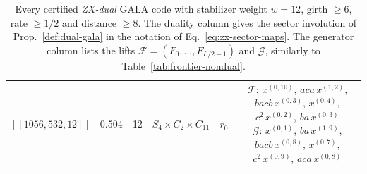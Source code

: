 \begin{table}[t]
\begin{tabular}{lccccc}
$[[1056, 532, 12]]$ & 0.504 & 12 & $S_{4} \times C_{2}\!\times\!C_{11}$ & $r_0^{}$ & \parbox[t]{0.46\textwidth}{\raggedright $\mathcal{F}$: $x^{(0,10)}$, $aca\,x^{(1,2)}$, $bacb\,x^{(0,3)}$, $x^{(0,4)}$, $c^{2}\,x^{(0,2)}$, $ba\,x^{(0,3)}$ \\ $\mathcal{G}$: $x^{(0,1)}$, $ba\,x^{(1,9)}$, $bacb\,x^{(0,8)}$, $x^{(0,7)}$, $c^{2}\,x^{(0,9)}$, $aca\,x^{(0,8)}$} \\
\bottomrule
\end{tabular}
\caption{Every certified \emph{ZX-dual} GALA code with stabilizer weight $w=12$, girth $\geq6$, rate $\geq1/2$ and distance $\geq8$. The duality column gives the sector involution of Prop.~\ref{def:dual-gala} in the notation of Eq.~\eqref{eq:zx-sector-maps}. The generator column lists the lifts $\mathcal F=(F_0,\dots,F_{L/2-1})$ and $\mathcal G$, similarly to Table~\ref{tab:frontier-nondual}.}
\label{tab:frontier-selfdual-good}
\end{table}

